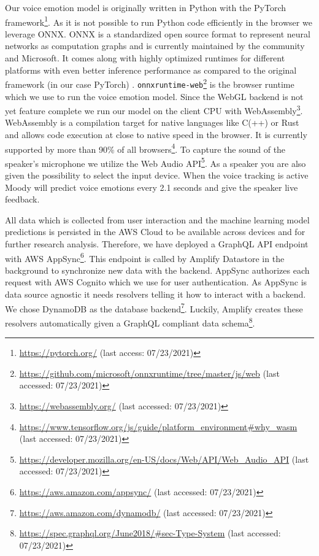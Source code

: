 Our voice emotion model is originally written in Python with the PyTorch framework\footnote{\url{https://pytorch.org/} (last access: 07/23/2021)}. As it is not possible to run Python code efficiently in the browser we leverage ONNX. ONNX is a standardized open source format to represent neural networks as computation graphs and is currently maintained by the community and Microsoft. It comes along with highly optimized runtimes for different platforms with even better inference performance as compared to the original framework (in our case PyTorch) \cite{onnx_runtime_developers_onnx_2021}. \texttt{onnxruntime-web}\footnote{\url{https://github.com/microsoft/onnxruntime/tree/master/js/web} (last accessed: 07/23/2021)} is the browser runtime which we use to run the voice emotion model. Since the WebGL backend is not yet feature complete we run our model on the client CPU with WebAssembly\footnote{\url{https://webassembly.org/} (last accessed: 07/23/2021)}. WebAssembly is a compilation target for native languages like C(++) or Rust and allows code execution at close to native speed in the browser. It is currently supported by more than 90\% of all browsers\footnote{\url{https://www.tensorflow.org/js/guide/platform_environment#why_wasm} (last accessed: 07/23/2021)}. To capture the sound of the speaker's microphone we utilize the Web Audio API\footnote{\url{https://developer.mozilla.org/en-US/docs/Web/API/Web_Audio_API} (last accessed: 07/23/2021)}. As a speaker you are also given the possibility to select the input device. When the voice tracking is active Moody will predict voice emotions every 2.1 seconds and give the speaker live feedback.

All data which is collected from user interaction and the machine learning model predictions is persisted in the AWS Cloud to be available across devices and for further research analysis. Therefore, we have deployed a GraphQL API endpoint with AWS AppSync\footnote{\url{https://aws.amazon.com/appsync/} (last accessed: 07/23/2021)}. This endpoint is called by Amplify Datastore in the background to synchronize new data with the backend. AppSync authorizes each request with AWS Cognito which we use for user authentication. As AppSync is data source agnostic it needs resolvers telling it how to interact with a backend. We chose DynamoDB as the database backend\footnote{\url{https://aws.amazon.com/dynamodb/} (last accessed: 07/23/2021)}. Luckily, Amplify creates these resolvers automatically given a GraphQL compliant data schema\footnote{\url{https://spec.graphql.org/June2018/#sec-Type-System} (last accessed: 07/23/2021)}.

